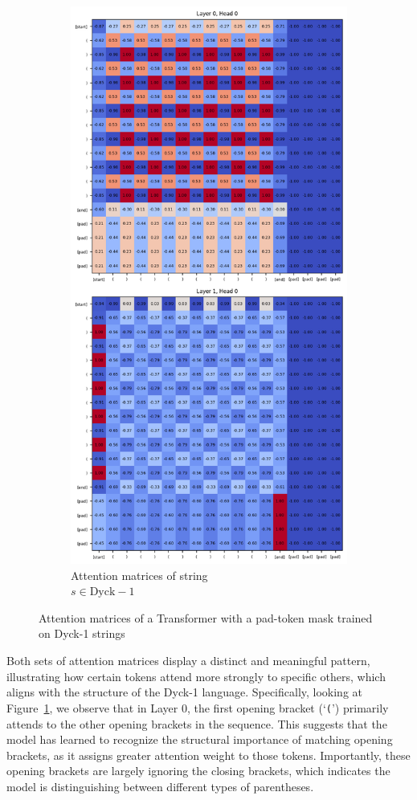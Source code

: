 \begin{figure}[h]
\begin{subfigure}{.5\textwidth}
      \includegraphics[width=.8\linewidth]{docs/figs/dyck_1/sequence_4_dyck_1.png}
      \caption{Attention matrices of string \\ $s \in \text{Dyck}-1$}
      \label{fig:pos-dyck-1}
    \end{subfigure}
    \caption{Attention matrices of a Transformer with a pad-token mask trained on Dyck-1 strings}
    \label{fig:bidirectional-dyck-1}
\end{figure}

Both sets of attention matrices display a distinct and meaningful pattern, illustrating how certain tokens attend more strongly to specific others, which aligns with the structure of the Dyck-1 language. Specifically, looking at Figure~\ref{fig:pos-dyck-1}, we observe that in Layer 0, the first opening bracket (`\verb|(|') primarily attends to the other opening brackets in the sequence. This suggests that the model has learned to recognize the structural importance of matching opening brackets, as it assigns greater attention weight to those tokens. Importantly, these opening brackets are largely ignoring the closing brackets, which indicates the model is distinguishing between different types of parentheses.


